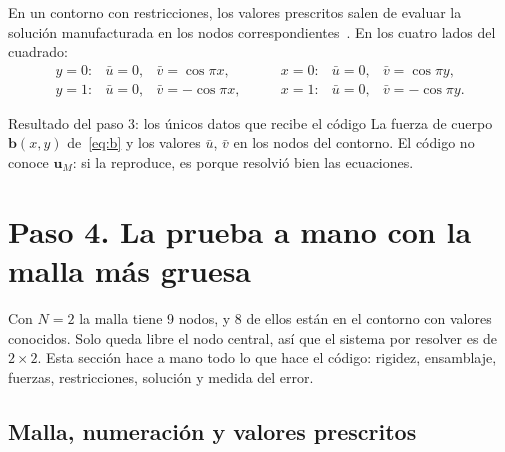 \documentclass[11pt,a4paper]{article}
\newcommand{\uM}{\bm{u}_M}
\begin{document}
En un contorno con restricciones, los valores prescritos salen de evaluar la solución manufacturada
en los nodos correspondientes~\cite[p.~26]{salari}. En los cuatro lados del cuadrado:
\[
  \begin{array}{lll}
    y=0: & \bar u = 0, & \bar v = \cos\pi x,\\
    y=1: & \bar u = 0, & \bar v = -\cos\pi x,
  \end{array}\qquad
  \begin{array}{lll}
    x=0: & \bar u = 0, & \bar v = \cos\pi y,\\
    x=1: & \bar u = 0, & \bar v = -\cos\pi y.
  \end{array}
\]

\begin{resultado}{Resultado del paso 3: los únicos datos que recibe el código}
La fuerza de cuerpo $\bm b(x,y)$ de~\eqref{eq:b} y los valores $\bar u$, $\bar v$ en los nodos del
contorno. El código no conoce $\uM$: si la reproduce, es porque resolvió bien las ecuaciones.
\end{resultado}

\section{Paso 4. La prueba a mano con la malla más gruesa}\label{sec:mano}

Con $N=2$ la malla tiene 9 nodos, y 8 de ellos están en el contorno con valores conocidos. Solo
queda libre el nodo central, así que el sistema por resolver es de $2\times2$. Esta sección hace a
mano todo lo que hace el código: rigidez, ensamblaje, fuerzas, restricciones, solución y medida
del error.

\subsection{Malla, numeración y valores prescritos}
\end{document}
